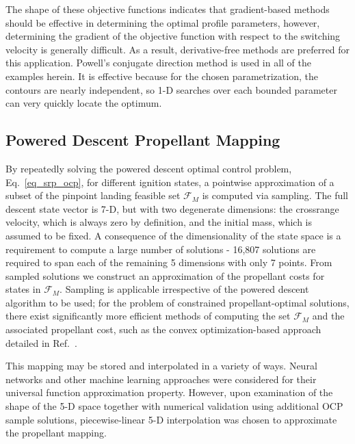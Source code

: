 \documentclass[letterpaper, paper,11pt]{AAS}
\begin{document}
The shape of these objective functions indicates that gradient-based methods should be effective in determining the optimal profile parameters, however, determining the gradient of the objective function with respect to the switching velocity is generally difficult. As a result, derivative-free methods are preferred for this application. Powell's conjugate direction method \cite{PowellsMethod} is used in all of the examples herein. It is effective because for the chosen parametrization, the contours are nearly independent, so 1-D searches over each bounded parameter can very quickly locate the optimum. 

\subsection{Powered Descent Propellant Mapping}
By repeatedly solving the powered descent optimal control problem, Eq.~\ref{eq_srp_ocp}, for different ignition states, a pointwise approximation of a subset of the pinpoint landing feasible set $\mathcal{F}_M$ is computed via sampling. The full descent state vector is 7-D, but with two degenerate dimensions: the crossrange velocity, which is always zero by definition, and the initial mass, which is assumed to be fixed. A consequence of the dimensionality of the state space is a requirement to compute a large number of solutions -  16,807 solutions are required to span each of the remaining 5 dimensions with only 7 points. From sampled solutions we construct an approximation of the propellant costs for states in $\mathcal{F}_M$. Sampling is applicable irrespective of the powered descent algorithm to be used; for the problem of constrained propellant-optimal solutions, there exist significantly more efficient methods of computing the set $\mathcal{F}_M$ and the associated propellant cost, such as the convex optimization-based approach detailed in Ref.~\cite{SRP_ControllableSets}.

This mapping may be stored and interpolated in a variety of ways. Neural networks and other machine learning approaches were considered for their universal function approximation property. However, upon examination of the shape of the 5-D space together with numerical validation using additional OCP sample solutions, piecewise-linear 5-D interpolation was chosen to approximate the propellant mapping.
\end{document}
